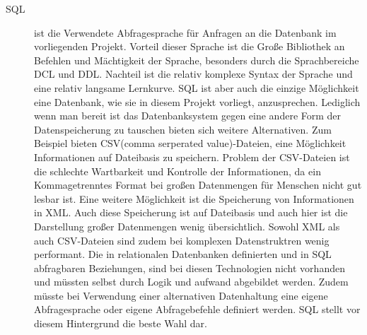 \begin{description}
  \item[SQL] ist die Verwendete Abfragesprache für Anfragen an die Datenbank im vorliegenden Projekt. Vorteil dieser Sprache ist die Große Bibliothek an Befehlen und Mächtigkeit der Sprache, besonders durch die Sprachbereiche DCL und DDL. Nachteil ist die relativ komplexe Syntax der Sprache und eine relativ langsame Lernkurve. SQL ist aber auch die einzige Möglichkeit eine Datenbank, wie sie in diesem Projekt vorliegt, anzusprechen. Lediglich wenn man bereit ist das Datenbanksystem gegen eine andere Form der Datenspeicherung zu tauschen bieten sich weitere Alternativen. Zum Beispiel bieten CSV(comma serperated value)-Dateien, eine Möglichkeit Informationen auf Dateibasis zu speichern. Problem der CSV-Dateien ist die schlechte Wartbarkeit und Kontrolle der Informationen, da ein Kommagetrenntes Format bei großen Datenmengen für Menschen nicht gut lesbar ist. Eine weitere Möglichkeit ist die Speicherung von Informationen in XML. Auch diese Speicherung ist auf Dateibasis und auch hier ist die Darstellung großer Datenmengen wenig übersichtlich. Sowohl XML als auch CSV-Dateien sind zudem bei komplexen Datenstruktren wenig performant. Die in relationalen Datenbanken definierten und in SQL abfragbaren Beziehungen, sind bei diesen Technologien nicht vorhanden und müssten selbst durch Logik und aufwand abgebildet werden. Zudem müsste bei Verwendung einer alternativen Datenhaltung eine eigene Abfragesprache oder eigene Abfragebefehle definiert werden. SQL stellt vor diesem Hintergrund die beste Wahl dar.
\end{description}
